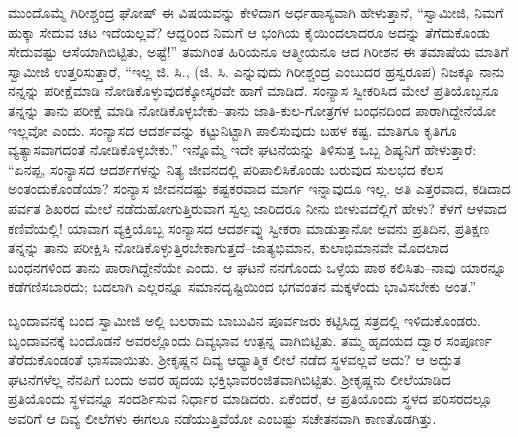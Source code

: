 ಮುಂದೊಮ್ಮೆ ಗಿರೀಶ್ಚಂದ್ರ ಘೋಷ್ ಈ ವಿಷಯವನ್ನು ಕೇಳಿದಾಗ ಅರ್ಧಹಾಸ್ಯವಾಗಿ ಹೇಳುತ್ತಾನೆ, “ಸ್ವಾಮೀಜಿ, ನಿಮಗೆ ಹುಕ್ಕಾ ಸೇದುವ ಚಟ ಇದೆಯಲ್ಲವೆ? ಆದ್ದರಿಂದ ನಿಮಗೆ ಆ ಭಂಗಿಯ ಕೈಯಿಂದಲಾದರೂ ಅದನ್ನು ತೆಗೆದುಕೊಂಡು ಸೇದುವಷ್ಟು ಆಸೆಯಾಗಿಬಿಟ್ಟಿತು, ಅಷ್ಟೆ!” ತಮಗಿಂತ ಹಿರಿಯನೂ ಆತ್ಮೀಯನೂ ಆದ ಗಿರೀಶನ ಈ ತಮಾಷೆಯ ಮಾತಿಗೆ ಸ್ವಾಮೀಜಿ ಉತ್ತರಿಸುತ್ತಾರೆ, “ಇಲ್ಲ ಜಿ. ಸಿ., (ಜಿ. ಸಿ. ಎನ್ನುವುದು ಗಿರೀಶ್ಚಂದ್ರ ಎಂಬುದರ ಹ್ರಸ್ವರೂಪ) ನಿಜಕ್ಕೂ ನಾನು ನನ್ನನ್ನು ಪರೀಕ್ಷೆಮಾಡಿ ನೋಡಿಕೊಳ್ಳುವುದಕ್ಕೋಸ್ಕರವೇ ಹಾಗೆ ಮಾಡಿದೆ. ಸಂನ್ಯಾಸ ಸ್ವೀಕರಿಸಿದ ಮೇಲೆ ಪ್ರತಿಯೊಬ್ಬನೂ ತನ್ನನ್ನು ತಾನು ಪರೀಕ್ಷೆ ಮಾಡಿ ನೋಡಿಕೊಳ್ಳಬೇಕು–ತಾನು ಜಾತಿ-ಕುಲ-ಗೋತ್ರಗಳ ಬಂಧನದಿಂದ ಪಾರಾಗಿದ್ದೇನೆಯೋ ಇಲ್ಲವೋ ಎಂದು. ಸಂನ್ಯಾಸದ ಆದರ್ಶವನ್ನು ಕಟ್ಟುನಿಟ್ಟಾಗಿ ಪಾಲಿಸುವುದು ಬಹಳ ಕಷ್ಟ. ಮಾತಿಗೂ ಕೃತಿಗೂ ವ್ಯತ್ಯಾಸವಾಗದಂತೆ ನೋಡಿಕೊಳ್ಳಬೇಕು.” ಇನ್ನೊಮ್ಮೆ ಇದೇ ಘಟನೆಯನ್ನು ತಿಳಿಸುತ್ತ ಒಬ್ಬ ಶಿಷ್ಯನಿಗೆ ಹೇಳುತ್ತಾರೆ: “ಏನಪ್ಪ, ಸಂನ್ಯಾಸದ ಆದರ್ಶಗಳನ್ನು ನಿತ್ಯ ಜೀವನದಲ್ಲಿ ಪರಿಪಾಲಿಸಿಕೊಂಡು ಬರುವುದ ಸುಲಭದ ಕೆಲಸ ಅಂತಂದುಕೊಂಡೆಯಾ? ಸಂನ್ಯಾಸ ಜೀವನದಷ್ಟು ಕಷ್ಟಕರವಾದ ಮಾರ್ಗ ಇನ್ನಾವುದೂ ಇಲ್ಲ. ಅತಿ ಎತ್ತರವಾದ, ಕಡಿದಾದ ಪರ್ವತ ಶಿಖರದ ಮೇಲೆ ನಡೆದುಹೋಗುತ್ತಿರುವಾಗ ಸ್ವಲ್ಪ ಜಾರಿದರೂ ನೀನು ಬೀಳುವದೆಲ್ಲಿಗೆ ಹೇಳು? ಕೆಳಗೆ ಆಳವಾದ ಕಣಿವೆಯಲ್ಲಿ! ಯಾವಾಗ ವ್ಯಕ್ತಿಯೊಬ್ಬ ಸಂನ್ಯಾಸದ ಆದರ್ಶವ್ನು ಸ್ವೀಕರಾ ಮಾಡುತ್ತಾನೋ ಅವನು ಪ್ರತಿದಿನ, ಪ್ರತಿಕ್ಷಣ ತನ್ನನ್ನು ತಾನು ಪರೀಕ್ಷಿಸಿ ನೋಡಿಕೊಳ್ಳುತ್ತಿರಬೇಕಾಗುತ್ತದೆ–ಜಾತ್ಯಭಿಮಾನ, ಕುಲಾಭಿಮಾನವೇ ಮೊದಲಾದ ಬಂಧನಗಳಿಂದ ತಾನು ಪಾರಾಗಿದ್ದೇನೆಯೇ ಎಂದು. ಆ ಘಟನೆ ನನಗೊಂದು ಒಳ್ಳೆಯ ಪಾಠ ಕಲಿಸಿತು–ನಾವು ಯಾರನ್ನೂ ಕಡೆಗಣಿಸಬಾರದು; ಬದಲಾಗಿ ಎಲ್ಲರನ್ನೂ ಸಮಾನದೃಷ್ಟಿಯಿಂದ ಭಗವಂತನ ಮಕ್ಕಳೆಂದು ಭಾವಿಸಬೇಕು ಅಂತ.”

ಬೃಂದಾವನಕ್ಕೆ ಬಂದ ಸ್ವಾಮೀಜಿ ಅಲ್ಲಿ ಬಲರಾಮ ಬಾಬುವಿನ ಪೂರ್ವಜರು ಕಟ್ಟಿಸಿದ್ದ ಸತ್ರದಲ್ಲಿ ಇಳಿದುಕೊಂಡರು. ಬೃಂದಾವನಕ್ಕೆ ಬಂದೊಡನೆ ಅವರಲ್ಲೊಂದು ದಿವ್ಯಭಾವ ಉತ್ಪನ್ನ ವಾಗಿಬಿಟ್ಟಿತು. ತಮ್ಮ ಹೃದಯದ ದ್ವಾರ ಸಂಪೂರ್ಣ ತೆರೆದುಕೊಂಡಂತೆ ಭಾಸವಾಯಿತು. ಶ್ರೀಕೃಷ್ಣನ ದಿವ್ಯ ಆಧ್ಯಾತ್ಮಿಕ ಲೀಲೆ ನಡೆದ ಸ್ಥಳವಲ್ಲವೆ ಅದು? ಆ ಅದ್ಭುತ ಘಟನೆಗಳೆಲ್ಲ ನೆನಪಿಗೆ ಬಂದು ಅವರ ಹೃದಯ ಭಕ್ತಿಭಾವರಂಜಿತವಾಗಿಬಿಟ್ಟಿತು. ಶ್ರೀಕೃಷ್ಣನು ಲೀಲೆಯಾಡಿದ ಪ್ರತಿಯೊಂದು ಸ್ಥಳವನ್ನೂ ಸಂದರ್ಶಿಸುವ ನಿರ್ಧಾರ ಮಾಡಿದರು. ಏಕೆಂದರೆ, ಆ ಪ್ರತಿಯೊಂದು ಸ್ಥಳದ ಪರಿಸರದಲ್ಲೂ ಅವರಿಗೆ ಆ ದಿವ್ಯ ಲೀಲೆಗಳು ಈಗಲೂ ನಡೆಯುತ್ತಿವೆಯೋ ಎಂಬಷ್ಟು ಸಚೇತನವಾಗಿ ಕಾಣತೊಡಗಿತ್ತು.

